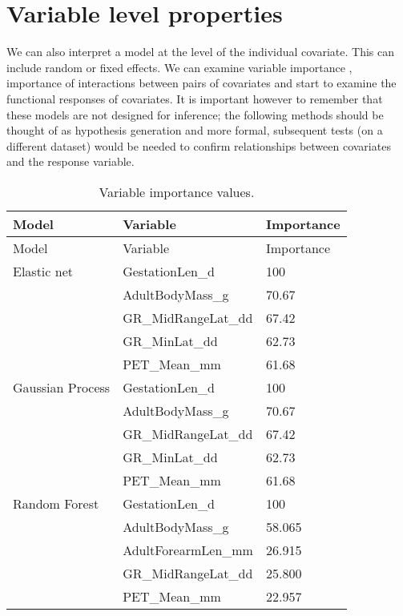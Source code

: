 \documentclass[10pt,]{article}
\begin{document}

\section{Variable level properties}\label{variable-level-properties}

We can also interpret a model at the level of the individual covariate.
This can include random or fixed effects.
We can examine variable importance \citep{oppel2009alternative}, importance of interactions between pairs of covariates and start to examine the functional responses of covariates.
It is important however to remember that these models are not designed for inference; the following methods should be thought of as hypothesis generation and more formal, subsequent tests (on a different dataset) would be needed to confirm relationships between covariates and the response variable.

\begin{table}[t!]
\begin{longtable}[c]{@{}lll@{}}
\caption{Variable importance values. \label{tbl:varimp}}\tabularnewline
\toprule
Model & Variable & Importance\tabularnewline
\midrule
\endfirsthead
\toprule
Model & Variable & Importance\tabularnewline
\midrule
\endhead
Elastic net & GestationLen\_d & 100\tabularnewline
& AdultBodyMass\_g & 70.67\tabularnewline
& GR\_MidRangeLat\_dd & 67.42\tabularnewline
& GR\_MinLat\_dd & 62.73\tabularnewline
& PET\_Mean\_mm & 61.68\tabularnewline
Gaussian Process & GestationLen\_d & 100\tabularnewline
& AdultBodyMass\_g & 70.67\tabularnewline
& GR\_MidRangeLat\_dd & 67.42\tabularnewline
& GR\_MinLat\_dd & 62.73\tabularnewline
& PET\_Mean\_mm & 61.68\tabularnewline
Random Forest & GestationLen\_d & 100\tabularnewline
& AdultBodyMass\_g & 58.065\tabularnewline
& AdultForearmLen\_mm & 26.915\tabularnewline
& GR\_MidRangeLat\_dd & 25.800\tabularnewline
& PET\_Mean\_mm & 22.957\tabularnewline
\bottomrule
\end{longtable}
\end{table}
\end{document}
